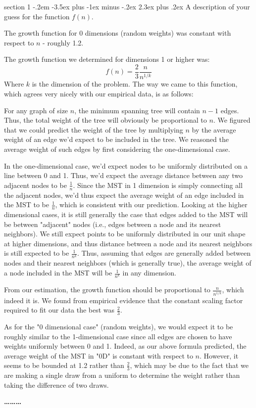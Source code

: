 \documentclass[12pt]{article}
\makeatletter
\newenvironment{problem}{\@startsection
       {section}
       {1}
       {-.2em}
       {-3.5ex plus -1ex minus -.2ex}
       {2.3ex plus .2ex}
       {\pagebreak[3]%
       \large\bf\noindent{Problem }
       }
       }
       {%
       \begin{center}\large\bf \ldots\ldots\ldots\end{center}}
\makeatother
\begin{document}
\begin{problem}{}
A description of your guess for the function $f(n)$.

The growth function for 0 dimensions (random weights) was constant with respect to $n$ - roughly 1.2.

The growth function we determined for dimensions 1 or higher was:
\begin{equation}
f(n) = \frac{2}{3}\frac{n}{n^{1/k}}
\end{equation}
Where $k$ is the dimension of the problem.  The way we came to this function, which agrees very nicely with our empirical data, is as follows:

For any graph of size $n$, the minimum spanning tree will contain $n-1$ edges.  Thus, the total weight of the tree will obviously be proportional to $n$.  We figured that we could predict the weight of the tree by multiplying $n$ by the average weight of an edge we'd expect to be included in the tree.  We reasoned the average weight of such edges by first considering the one-dimensional case.

In the one-dimensional case, we'd expect nodes to be uniformly distributed on a line between 0 and 1.  Thus, we'd expect the average distance between any two adjacent nodes to be $\frac{1}{n}$.  Since the MST in 1 dimension is simply connecting all the adjacent nodes, we'd thus expect the average weight of an edge included in the MST to be $\frac{1}{n}$, which is consistent with our prediction.  Looking at the higher dimensional cases, it is still generally the case that edges added to the MST will be between "adjacent" nodes (i.e., edges between a node and its nearest neighbors).  We still expect points to be uniformly distributed in our unit shape at higher dimensions, and thus distance between a node and its nearest neighbors is still expected to be $\frac{1}{n^k}$.  Thus, assuming that edges are generally added between nodes and their nearest neighbors (which is generally true), the average weight of a node included in the MST will be $\frac{1}{n^k}$ in any dimension.

From our estimation, the growth function should be proportional to $\frac{n}{n^{1/k}}$, which indeed it is.  We found from empirical evidence that the constant scaling factor required to fit our data the best was $\frac{2}{3}$.

As for the "0 dimensional case" (random weights), we would expect it to be roughly similar to the 1-dimensional case since all edges are chosen to have weights uniformly between 0 and 1.  Indeed, as our above formula predicted, the average weight of the MST in "0D" is constant with respect to $n$.  However, it seems to be bounded at 1.2 rather than $\frac{2}{3}$, which may be due to the fact that we are making a single draw from a uniform to determine the weight rather than taking the difference of two draws.

\end{problem}
\end{document}
